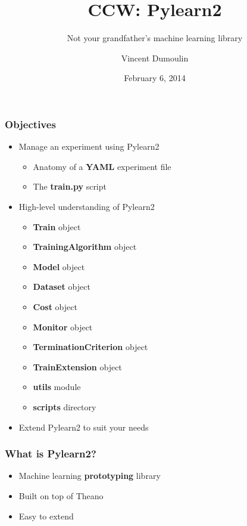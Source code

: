 \documentclass[mathserif, xcolor=dvipsnames]{beamer}
\title{CCW: Pylearn2}
\subtitle{Not your grandfather's machine learning library}
\author{Vincent Dumoulin}
\date{February 6, 2014}
\begin{document}
\begin{frame}[plain]
    \titlepage
\end{frame}

\begin{frame}
    \frametitle{Objectives}
    \begin{itemize}\addtolength{\itemsep}{0.5\baselineskip}
        \item{
            {\Large Manage an experiment using Pylearn2}
            \begin{itemize}
                \item{Anatomy of a \textbf{YAML} experiment file}
                \item{The \textbf{train.py} script}
            \end{itemize}
        }
        \item{
            {\Large High-level understanding of Pylearn2}
            \begin{itemize}
                \item{\textbf{Train} object}
                \item{\textbf{TrainingAlgorithm} object}
                \item{\textbf{Model} object}
                \item{\textbf{Dataset} object}
                \item{\textbf{Cost} object}
                \item{\textbf{Monitor} object}
                \item{\textbf{TerminationCriterion} object}
                \item{\textbf{TrainExtension} object}
                \item{\textbf{utils} module}
                \item{\textbf{scripts} directory}
            \end{itemize}
        }
        \item{
            {\Large Extend Pylearn2 to suit your needs}
        }
    \end{itemize}
\end{frame}

\begin{frame}
    \frametitle{What is Pylearn2?}
    \begin{itemize}\addtolength{\itemsep}{2.0\baselineskip}
        \item{\LARGE Machine learning \textbf{prototyping} library}
        \item{\LARGE Built on top of Theano}
        \item{\LARGE Easy to extend}
    \end{itemize}
\end{frame}
\end{document}
